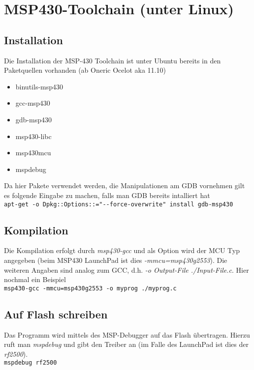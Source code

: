 \section{MSP430-Toolchain (unter Linux)}
\subsection{Installation}
Die Installation der MSP-430 Toolchain ist unter Ubuntu bereits in den 
Paketquellen vorhanden (ab Oneric Ocelot aka 11.10)

\begin{itemize}
    \item binutils-msp430 
    \item gcc-msp430 
    \item gdb-msp430 
    \item msp430-libc 
    \item msp430mcu 
    \item mspdebug
\end{itemize}

\noindent
Da hier Pakete verwendet werden, die Manipulationen am GDB vornehmen gilt es
folgende Eingabe zu machen, falls man GDB bereits intalliert hat \\

\verb?apt-get -o Dpkg::Options::="--force-overwrite" install gdb-msp430?

\subsection{Kompilation}
Die Kompilation erfolgt durch \emph{msp430-gcc} und als Option wird der MCU Typ
angegeben (beim MSP430 LaunchPad ist dies \emph{-mmcu=msp430g2553}). Die weiteren
Angaben sind analog zum GCC, d.h. \emph{-o Output-File ./Input-File.c}.
Hier nochmal ein Beispiel \\

\verb?msp430-gcc -mmcu=msp430g2553 -o myprog ./myprog.c?

\subsection{Auf Flash schreiben}
Das Programm wird mittels des MSP-Debugger auf das Flash übertragen. Hierzu
ruft man \emph{mspdebug} und gibt den Treiber an (im Falle des LaunchPad ist
dies der \emph{rf2500}).\\

\verb?mspdebug rf2500?\\

